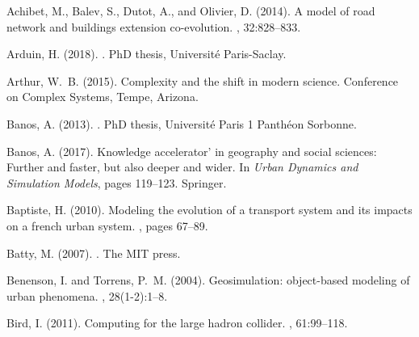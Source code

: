 \documentclass[graybox]{svmult}
\begin{document}
\begin{thebibliography}{}

Achibet, M., Balev, S., Dutot, A., and Olivier, D. (2014).
\newblock A model of road network and buildings extension co-evolution.
, 32:828--833.

Arduin, H. (2018).
.
\newblock PhD thesis, Universit{\'e} Paris-Saclay.

Arthur, W.~B. (2015).
\newblock Complexity and the shift in modern science.
\newblock Conference on Complex Systems, Tempe, Arizona.

Banos, A. (2013).
.
\newblock PhD thesis, Universit{\'e} Paris 1 Panth{\'e}on Sorbonne.

Banos, A. (2017).
\newblock Knowledge accelerator' in geography and social sciences: Further and
  faster, but also deeper and wider.
\newblock In {\em Urban Dynamics and Simulation Models}, pages 119--123.
  Springer.

Baptiste, H. (2010).
\newblock Modeling the evolution of a transport system and its impacts on a
  french urban system.
, pages
  67--89.

Batty, M. (2007).
.
\newblock The MIT press.

Benenson, I. and Torrens, P.~M. (2004).
\newblock Geosimulation: object-based modeling of urban phenomena.
, 28(1-2):1--8.

Bird, I. (2011).
\newblock Computing for the large hadron collider.
, 61:99--118.


\end{thebibliography}
\end{document}
